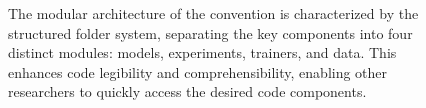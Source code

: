 \begin{figure}
\centering
{}
\caption{The modular architecture of the convention is characterized by the structured folder system, separating the key components into four distinct modules: models, experiments, trainers, and data. This enhances code legibility and comprehensibility, enabling other researchers to quickly access the desired code components.}
\end{figure}










